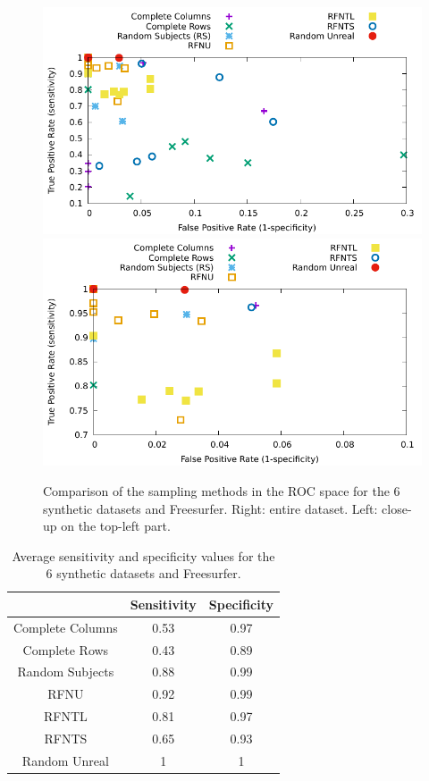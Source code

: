 \documentclass[10pt, conference, compsocconf]{IEEEtran}
\begin{document}
\begin{figure}
\includegraphics[width=\columnwidth]{data/results/roc/roc.pdf}
\includegraphics[width=\columnwidth]{data/results/roc/roc-closeup.pdf}
\caption{Comparison of the sampling methods in the ROC space for the 6 synthetic datasets and Freesurfer. Right: entire dataset. Left: close-up on the top-left part.}
\label{fig:roc}
\end{figure}

\begin{table}
\centering
\begin{tabular}{ccc}
& Sensitivity & Specificity \\
\hline
Complete Columns & 0.53 & 0.97\\
Complete Rows & 0.43 & 0.89\\
Random Subjects & 0.88 & 0.99\\
RFNU & 0.92 & 0.99 \\
RFNTL & 0.81 & 0.97\\
RFNTS & 0.65 & 0.93 \\
Random Unreal & 1 & 1
\end{tabular}
\caption{Average sensitivity and specificity values for the 6 synthetic datasets and Freesurfer.}
\label{table:roc}
\end{table}
\end{document}
